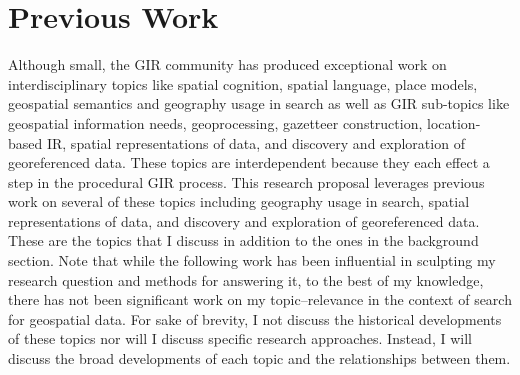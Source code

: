 \chapter{Previous Work} \label{ch:[chapter 4 label]}

Although small, the GIR community has produced exceptional work on interdisciplinary topics like spatial cognition, spatial language, place models, geospatial semantics and geography usage in search as well as GIR sub-topics like geospatial information needs, \gls{geoprocessing}, \gls{gazetteer} construction, location-based IR, spatial representations of data, and discovery and exploration of \gls{georeference}d data. These topics are interdependent because they each effect a step in the procedural GIR process. This research proposal leverages previous work on several of these topics including geography usage in search, spatial representations of data, and discovery and exploration of georeferenced data. These are the topics that I discuss in addition to the ones in the background section. Note that while the following work has been influential in sculpting my research question and methods for answering it, to the best of my knowledge, there has not been significant work on my topic–relevance in the context of search for geospatial data. For sake of brevity, I not discuss the historical developments of these topics nor will I discuss specific research approaches. Instead, I will discuss the broad developments of each topic and the relationships between them.
